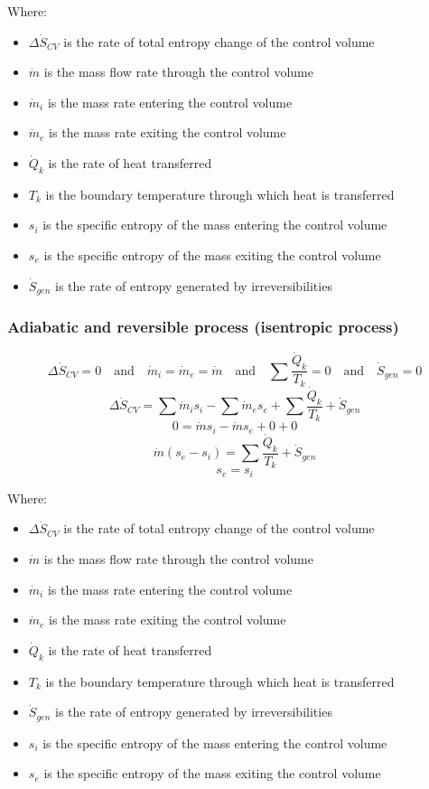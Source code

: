 \documentclass[11pt]{article}
\begin{document}
Where:
\begin{itemize}
\item \(\Delta \dot{S}_{CV}\) is the rate of total entropy change of the control volume
\item \(\dot{m}\) is the mass flow rate through the control volume
\item \(\dot{m}_i\) is the mass rate entering the control volume
\item \(\dot{m}_e\) is the mass rate exiting the control volume
\item \(\dot{Q}_k\) is the rate of heat transferred
\item \(T_k\) is the boundary temperature through which heat is transferred
\item \(s_i\) is the specific entropy of the mass entering the control volume
\item \(s_e\) is the specific entropy of the mass exiting the control volume
\item \(\dot{S}_{gen}\) is the rate of entropy generated by irreversibilities
\end{itemize}

 \newpage
\subsubsection{Adiabatic and reversible process (isentropic process)}
\label{sec:org76a843f}
\[\Delta \dot{S}_{CV} = 0 \quad \text{and} \quad \dot{m}_i = \dot{m}_e = \dot{m} \quad \text{and} \quad \sum \frac{\dot{Q}_k}{T_k} = 0 \quad \text{and} \quad \dot{S}_{gen} = 0\]
\[\Delta \dot{S}_{CV} = \sum \dot{m}_i s_i - \sum \dot{m}_e s_e + \sum \frac{\dot{Q}_k}{T_k} + \dot{S}_{gen}\]
\[0 = \dot{m} s_i - \dot{m} s_e + 0 + 0\]
\[\dot{m} (s_e - s_i) = \sum \frac{\dot{Q}_k}{T_k} + \dot{S}_{gen}\]
\[s_e = s_i\]

Where:
\begin{itemize}
\item \(\Delta \dot{S}_{CV}\) is the rate of total entropy change of the control volume
\item \(\dot{m}\) is the mass flow rate through the control volume
\item \(\dot{m}_i\) is the mass rate entering the control volume
\item \(\dot{m}_e\) is the mass rate exiting the control volume
\item \(\dot{Q}_k\) is the rate of heat transferred
\item \(T_k\) is the boundary temperature through which heat is transferred
\item \(\dot{S}_{gen}\) is the rate of entropy generated by irreversibilities
\item \(s_i\) is the specific entropy of the mass entering the control volume
\item \(s_e\) is the specific entropy of the mass exiting the control volume
\end{itemize}
\end{document}
